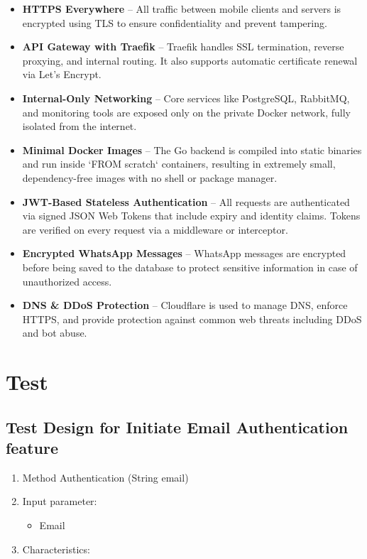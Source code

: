 \begin{itemize}
    \item \textbf{HTTPS Everywhere} – All traffic between mobile clients and servers is encrypted using TLS to ensure confidentiality and prevent tampering.
    \item \textbf{API Gateway with Traefik} – Traefik handles SSL termination, reverse proxying, and internal routing. It also supports automatic certificate renewal via Let's Encrypt.
    \item \textbf{Internal-Only Networking} – Core services like PostgreSQL, RabbitMQ, and monitoring tools are exposed only on the private Docker network, fully isolated from the internet.
    \item \textbf{Minimal Docker Images} – The Go backend is compiled into static binaries and run inside `FROM scratch` containers, resulting in extremely small, dependency-free images with no shell or package manager.
    \item \textbf{JWT-Based Stateless Authentication} – All requests are authenticated via signed JSON Web Tokens that include expiry and identity claims. Tokens are verified on every request via a middleware or interceptor.
    \item \textbf{Encrypted WhatsApp Messages} – WhatsApp messages are encrypted before being saved to the database to protect sensitive information in case of unauthorized access.
    \item \textbf{DNS \& DDoS Protection} – Cloudflare is used to manage DNS, enforce HTTPS, and provide protection against common web threats including DDoS and bot abuse.
\end{itemize}

\section{Test}

\subsection*{Test Design for Initiate Email Authentication feature}

\begin{enumerate}
    \item Method Authentication (String email)
    \item Input parameter:
    \begin{itemize}
        \item Email
    \end{itemize}
    \item Characteristics:
\end{enumerate}

